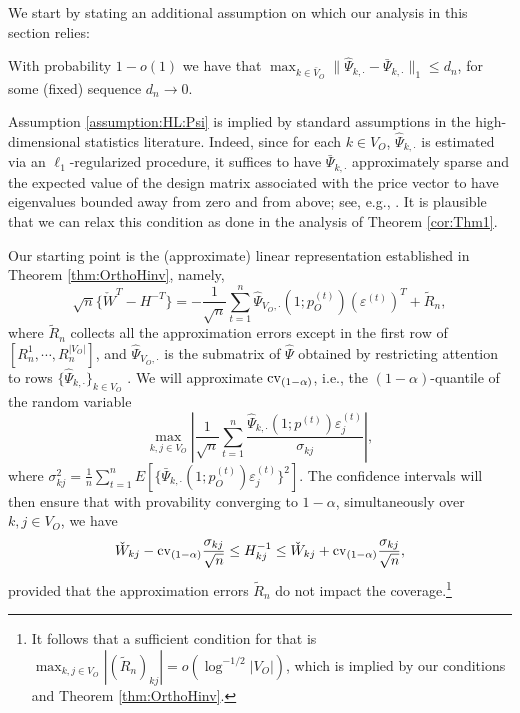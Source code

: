 \documentclass[opre,nonblindrev]{informs3} %
\def\hPkdot{\hat \Psi_{k,\cdot}}
\def\bPkdot{\bar{\Psi}_{k,\cdot} }
\def\hPkdot{\hat{\Psi}_{k,\cdot} }
\begin{document}
\begin{APPENDIX}{}
		We start by stating an additional assumption on which our analysis in this section relies:
	
	\begin{assumption}\label{assumption:HL:Psi}
		With probability $1-o(1)$ we have that
		$ \max_{k \in \bar{V}_O } \|
		\hPkdot  -
		\bPkdot\|_1 \leq
		d_n $, for some (fixed) sequence $d_n \to 0$.
	\end{assumption}
	
	
		Assumption \ref{assumption:HL:Psi} is implied by standard assumptions in the high-dimensional statistics literature. Indeed, since for each $k\in V_O$, $\hPkdot$ is estimated via an $\ell_1$-regularized procedure, it suffices to have  $\bPkdot$  approximately sparse and the expected value of the design matrix associated with the price vector to have eigenvalues  bounded away from zero and from above; see, e.g., \cite{BickelRitovTsybakov2009,BelloniChernozhukovHansen2011,c.h.zhang:s.zhang,GRD2014,javanmard2014confidence}. It is plausible that we can relax this condition as   done in the analysis of Theorem \ref{cor:Thm1}.
	
	
	
	
	Our starting point is the (approximate) linear representation established in Theorem \ref{thm:OrthoHinv}, namely,
	\begin{equation}\label{eq:MAM} \sqrt{n}\{ \check W^T - H^{-T}\} =  -
	\frac{1}{\sqrt{n}}\sum_{t=1}^n \hat \Psi_{V_O,\cdot} (1;{p}_O^{(t)})(\varepsilon^{(t)})^T  +
	\tilde R_n,  \end{equation}
	where $\tilde R_n$ collects all the approximation errors except in the first row of $[R_n^1, \cdots, R_n^{|V_O|}]$,
	and
	$\hat \Psi_{V_O,\cdot}$ is the submatrix of 
	$\hat \Psi$ obtained by restricting attention to rows $\{\hat \Psi_{k,\cdot}\}_{k\in V_O}$
	. We will approximate ${\rm cv}_{(1-\alpha)}$, i.e., the $(1-\alpha)$-quantile of the random variable
	$$ \max_{k,j\in V_O} \left|  \frac{1}{\sqrt{n}}\sum_{t=1}^n \frac{\hat \Psi_{k,\cdot}(1;{p}^{(t)})\varepsilon_j^{(t)}}{\sigma_{kj}} \right|,$$
	where $\sigma_{kj}^2 = \frac{1}{n}\sum_{t=1}^n E[\{\bar \Psi_{k,\cdot}(1;{p}_O^{(t)})\varepsilon_j^{(t)}\}^2]$. The confidence intervals  will then ensure that with provability converging to $1-\alpha$, simultaneously over $k,j\in V_O$, we have \begin{equation}\label{def:SCI} \check W_{kj} - {\rm cv}_{(1-\alpha)} \frac{\sigma_{kj}}{\sqrt{n}} \leq H^{-1}_{kj} \leq   \check W_{kj} + {\rm cv}_{(1-\alpha)} \frac{\sigma_{kj}}{\sqrt{n}}, \end{equation}
	provided that the approximation errors $\tilde R_n$ do not impact the coverage.\footnote{It follows that a sufficient condition for that is $\max_{k,j\in V_O}|(\tilde R_{n})_{kj}| = o(\log^{-1/2} |V_O|)$, which is implied by our conditions and Theorem \ref{thm:OrthoHinv}.}
	

\end{APPENDIX}
\end{document}
